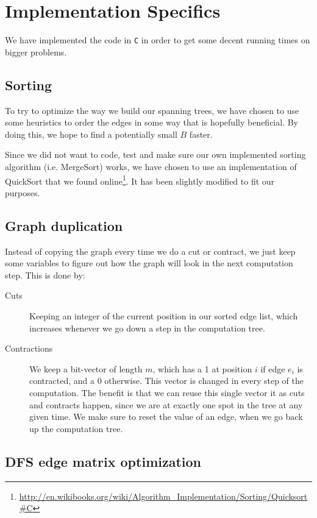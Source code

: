 \section{Implementation Specifics}

We have implemented the code in \texttt{C} in order to get some decent running times on bigger problems.

\subsection{Sorting}

To try to optimize the way we build our spanning trees, we have chosen to use some heuristics to order the edges in some way that is hopefully beneficial. By doing this, we hope to find a potentially small $B$ faster.

Since we did not want to code, test and make sure our own implemented sorting algorithm (i.e. MergeSort) works, we have chosen to use an implementation of QuickSort that we found online\footnote{\url{http://en.wikibooks.org/wiki/Algorithm\_Implementation/Sorting/Quicksort\#C} }. It has been slightly modified to fit our purposes.


\subsection{Graph duplication}

Instead of copying the graph every time we do a cut or contract, we just keep some variables to figure out how the graph will look in the next computation step. This is done by:

\begin{description}
\item[Cuts] Keeping an integer of the current position in our sorted edge list, which increases whenever we go down a step in the computation tree.

\item[Contractions] We keep a bit-vector of length $m$, which has a 1 at position $i$ if edge $e_i$ is contracted, and a 0 otherwise. This vector is changed in every step of the computation. The benefit is that we can reuse this single vector it as cuts and contracts happen, since we are at exactly one spot in the tree at any given time. We make sure to reset the value of an edge, when we go back up the computation tree.
\end{description}


\subsection{DFS edge matrix optimization}

